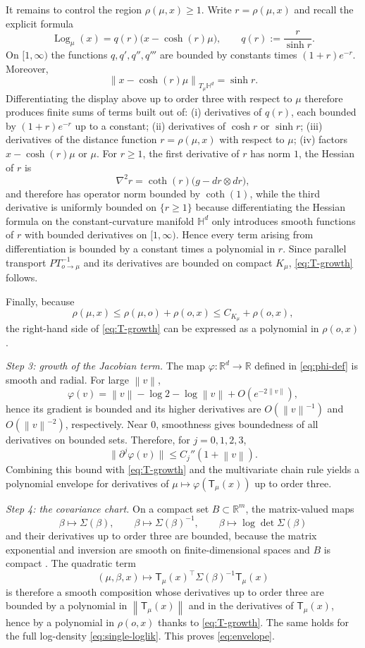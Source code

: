 \documentclass[11pt]{article}
\newcommand{\R}{\mathbb{R}}
\newcommand{\Hh}{\mathbb{H}}
\newcommand{\Log}{\operatorname{Log}}
\newcommand{\norm}[1]{\left\lVert #1\right\rVert}
\newcommand{\psiwrap}{\varphi}
\newcommand{\T}{\mathsf{T}}
\begin{document}
It remains to control the region $\rho(\mu,x)\ge 1$. Write $r=\rho(\mu,x)$ and recall the explicit formula
\[
\Log_\mu(x)=q(r)\bigl(x-\cosh(r)\mu\bigr),
\qquad
q(r):=\frac{r}{\sinh r}.
\]
On $[1,\infty)$ the functions $q,q',q'',q'''$ are bounded by constants times $(1+r)e^{-r}$. Moreover,
\[
\norm{x-\cosh(r)\mu}_{T_\mu\Hh^d}=\sinh r.
\]
Differentiating the display above up to order three with respect to $\mu$ therefore produces finite sums of terms built out of:
(i) derivatives of $q(r)$, each bounded by $(1+r)e^{-r}$ up to a constant;
(ii) derivatives of $\cosh r$ or $\sinh r$;
(iii) derivatives of the distance function $r=\rho(\mu,x)$ with respect to $\mu$;
(iv) factors $x-\cosh(r)\mu$ or $\mu$.
For $r\ge 1$, the first derivative of $r$ has norm $1$, the Hessian of $r$ is
\[
\nabla^2 r = \coth(r)\bigl(g-dr\otimes dr\bigr),
\]
and therefore has operator norm bounded by $\coth(1)$, while the third derivative is uniformly bounded on $\{r\ge 1\}$ because differentiating the Hessian formula on the constant-curvature manifold $\Hh^d$ only introduces smooth functions of $r$ with bounded derivatives on $[1,\infty)$. Hence every term arising from differentiation is bounded by a constant times a polynomial in $r$. Since parallel transport $PT_{o\to\mu}^{-1}$ and its derivatives are bounded on compact $K_\mu$, \eqref{eq:T-growth} follows.

Finally, because
\[
\rho(\mu,x)\le \rho(\mu,o)+\rho(o,x)\le C_{K_\mu}+\rho(o,x),
\]
the right-hand side of \eqref{eq:T-growth} can be expressed as a polynomial in $\rho(o,x)$.

\smallskip
\noindent\emph{Step 3: growth of the Jacobian term.}
The map $\psiwrap:\R^d\to\R$ defined in \eqref{eq:phi-def} is smooth and radial. For large $\norm{v}$,
\[
\psiwrap(v)=\norm{v}-\log 2-\log \norm{v}+O(e^{-2\norm{v}}),
\]
hence its gradient is bounded and its higher derivatives are $O(\norm{v}^{-1})$ and $O(\norm{v}^{-2})$, respectively. Near $0$, smoothness gives boundedness of all derivatives on bounded sets. Therefore, for $j=0,1,2,3$,
\[
\bigl\|\partial^j \psiwrap(v)\bigr\|
\le C_j''(1+\norm{v}).
\]
Combining this bound with \eqref{eq:T-growth} and the multivariate chain rule yields a polynomial envelope for derivatives of $\mu\mapsto \psiwrap(\T_\mu(x))$ up to order three.

\smallskip
\noindent\emph{Step 4: the covariance chart.}
On a compact set $B\subset\R^m$, the matrix-valued maps
\[
\beta\mapsto \Sigma(\beta),\qquad
\beta\mapsto \Sigma(\beta)^{-1},\qquad
\beta\mapsto \log\det \Sigma(\beta)
\]
and their derivatives up to order three are bounded, because the matrix exponential and inversion are smooth on finite-dimensional spaces and $B$ is compact \citep{bhatia_2009_PositiveDefiniteMatrices}. The quadratic term
\[
(\mu,\beta,x)\mapsto \T_\mu(x)^\top \Sigma(\beta)^{-1}\T_\mu(x)
\]
is therefore a smooth composition whose derivatives up to order three are bounded by a polynomial in $\norm{\T_\mu(x)}$ and in the derivatives of $\T_\mu(x)$, hence by a polynomial in $\rho(o,x)$ thanks to \eqref{eq:T-growth}. The same holds for the full log-density \eqref{eq:single-loglik}. This proves \eqref{eq:envelope}.
\end{document}
